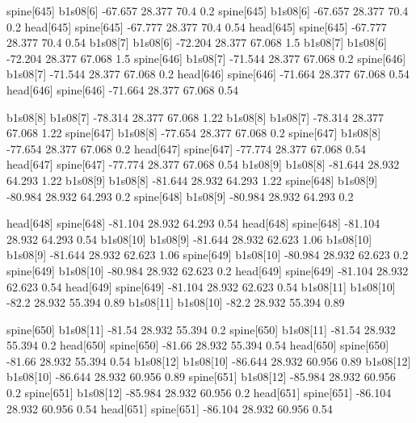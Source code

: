spine[645]    b1s08[6]    -67.657    28.377    70.4    0.2
spine[645]    b1s08[6]    -67.657    28.377    70.4    0.2
head[645]    spine[645]    -67.777    28.377    70.4    0.54
head[645]    spine[645]    -67.777    28.377    70.4    0.54
b1s08[7]    b1s08[6]    -72.204    28.377    67.068    1.5
b1s08[7]    b1s08[6]    -72.204    28.377    67.068    1.5
spine[646]    b1s08[7]    -71.544    28.377    67.068    0.2
spine[646]    b1s08[7]    -71.544    28.377    67.068    0.2
head[646]    spine[646]    -71.664    28.377    67.068    0.54
head[646]    spine[646]    -71.664    28.377    67.068    0.54


b1s08[8]    b1s08[7]    -78.314    28.377    67.068    1.22
b1s08[8]    b1s08[7]    -78.314    28.377    67.068    1.22
spine[647]    b1s08[8]    -77.654    28.377    67.068    0.2
spine[647]    b1s08[8]    -77.654    28.377    67.068    0.2
head[647]    spine[647]    -77.774    28.377    67.068    0.54
head[647]    spine[647]    -77.774    28.377    67.068    0.54
b1s08[9]    b1s08[8]    -81.644    28.932    64.293    1.22
b1s08[9]    b1s08[8]    -81.644    28.932    64.293    1.22
spine[648]    b1s08[9]    -80.984    28.932    64.293    0.2
spine[648]    b1s08[9]    -80.984    28.932    64.293    0.2


head[648]    spine[648]    -81.104    28.932    64.293    0.54
head[648]    spine[648]    -81.104    28.932    64.293    0.54
b1s08[10]    b1s08[9]    -81.644    28.932    62.623    1.06
b1s08[10]    b1s08[9]    -81.644    28.932    62.623    1.06
spine[649]    b1s08[10]    -80.984    28.932    62.623    0.2
spine[649]    b1s08[10]    -80.984    28.932    62.623    0.2
head[649]    spine[649]    -81.104    28.932    62.623    0.54
head[649]    spine[649]    -81.104    28.932    62.623    0.54
b1s08[11]    b1s08[10]    -82.2    28.932    55.394    0.89
b1s08[11]    b1s08[10]    -82.2    28.932    55.394    0.89


spine[650]    b1s08[11]    -81.54    28.932    55.394    0.2
spine[650]    b1s08[11]    -81.54    28.932    55.394    0.2
head[650]    spine[650]    -81.66    28.932    55.394    0.54
head[650]    spine[650]    -81.66    28.932    55.394    0.54
b1s08[12]    b1s08[10]    -86.644    28.932    60.956    0.89
b1s08[12]    b1s08[10]    -86.644    28.932    60.956    0.89
spine[651]    b1s08[12]    -85.984    28.932    60.956    0.2
spine[651]    b1s08[12]    -85.984    28.932    60.956    0.2
head[651]    spine[651]    -86.104    28.932    60.956    0.54
head[651]    spine[651]    -86.104    28.932    60.956    0.54


